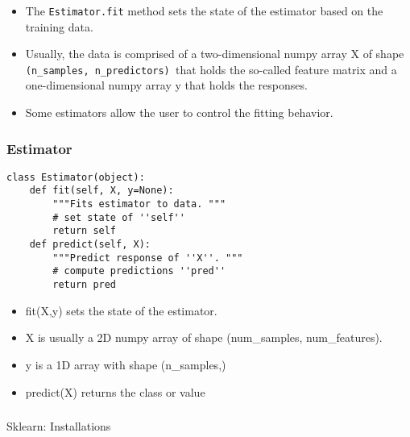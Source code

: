\begin{frame}[fragile]\frametitle{}
\begin{itemize}
\item The \texttt{Estimator.fit} method sets the state of the estimator based on the training data. 
\item Usually, the data is comprised of a two-dimensional numpy array X of shape \texttt{(n\_samples, n\_predictors) }that holds the so-called feature matrix and a one-dimensional numpy array y that holds the responses. 
\item Some estimators allow the user to control the fitting behavior. 
\end{itemize}
\end{frame}

\begin{frame}[fragile]\frametitle{Estimator}
\begin{lstlisting}
class Estimator(object):
    def fit(self, X, y=None):
        """Fits estimator to data. """
        # set state of ''self''
        return self
    def predict(self, X):
        """Predict response of ''X''. """
        # compute predictions ''pred''
        return pred
\end{lstlisting}
\begin{itemize}
\item fit(X,y) sets the state of the estimator.
\item  X is usually a 2D numpy array of shape (num\_samples, num\_features).
\item  y is a 1D array with shape (n\_samples,)
\item  predict(X) returns the class or value
\end{itemize}
\end{frame}

\begin{frame}[fragile]\frametitle{}
\begin{center}
{\Large Sklearn: Installations}
\end{center}
\end{frame}

%




